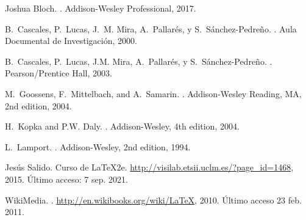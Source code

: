 \documentclass[11pt,a4paper]{article}
\begin{document}
\begin{thebibliography}{1}

Joshua Bloch.
.
\newblock Addison-Wesley Professional, 2017.

B.~Cascales, P.~Lucas, J.~M. Mira, A.~Pallarés, y S.~Sánchez-Pedreño.
.
\newblock Aula Documental de Investigación, 2000.

B.~Cascales, P.~Lucas, J.M. Mira, A.~Pallarés, y S.~{Sánchez-Pedreño}.
.
\newblock Pearson/Prentice Hall, 2003.

M.~Goossens, F.~Mittelbach, and A.~Samarin.
.
\newblock Addison-Wesley Reading, MA, 2nd edition, 2004.

H.~Kopka and {P.W.} Daly.
.
\newblock Addison-Wesley, 4th edition, 2004.

L.~Lamport.
.
\newblock Addison-Wesley, 2nd edition, 1994.

Jesús Salido.
\newblock Curso de {\LaTeX2e{}}.
 \url{http://visilab.etsii.uclm.es/?page_id=1468}, 2015.
\newblock Último acceso: 7 sep. 2021.

WikiMedia.
.
 \url{http://en.wikibooks.org/wiki/LaTeX}, 2010.
\newblock Último acceso 23 feb. 2011.

\end{thebibliography}

%
%
%
%
%
%
%
%
%
\end{document}
